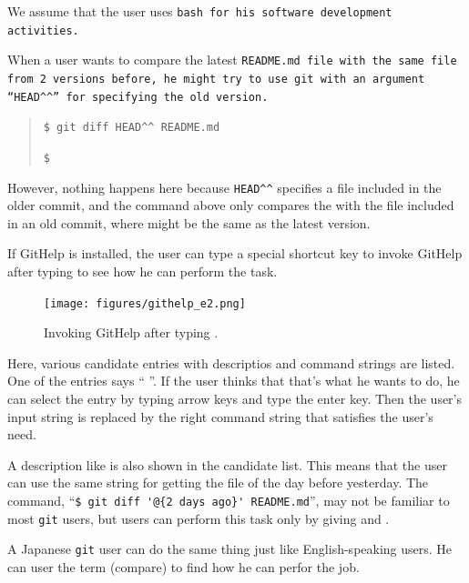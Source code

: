 \documentclass{sigchi}
\def\GH{\textsf{GitHelp}}
\def\GIT{\texttt{git}}
\begin{document}
We assume that the user uses \tt{bash} for his software
development activities.


When a user wants to compare the latest \tt{README.md} file
with the same file from 2 versions before,
he might try to use {\GIT} with an argument
``\verb|HEAD^^|''
for specifying the old version.

\begin{quotation}
  \verb|$ git diff HEAD^^ README.md|
  \par
  \verb|$|
\end{quotation}

However, nothing happens here because
\verb|HEAD^^|
specifies a file included in the older commit,
and the command above only compares the 
with the file included in an old commit, where
 might be the same as the latest version.

If {\GH} is installed,
the user can type a special shortcut key
to invoke {\GH} after typing  to see how he can
perform the task.

\begin{figure}[h]
  \texttt{[image: figures/githelp\_e2.png]}
  \caption{Invoking {\GH} after typing .}
  \label{bash1}
\end{figure}

Here, various candidate entries with
descriptios and command strings are listed.
One of the entries says
``  ''.
If the user thinks that that's what he wants to do,
he can select the entry by typing arrow keys and type the enter key.
Then the user's input string is replaced by the right command string
that satisfies the user's need.

A description like  is also shown in the candidate list.
This means that the user can use the same string 
for getting the  file of the day before yesterday.
The command,
``{\fontsize{9pt}{0pt}\selectfont\verb|$ git diff '@{2 days ago}' README.md|}'',
may not be familiar to most {\GIT} users,
but users can perform this task only by giving  and .

A Japanese {\GIT} user can do the same thing just like
English-speaking users.
He can user the term (compare) to find how he can perfor the job.
\end{document}
